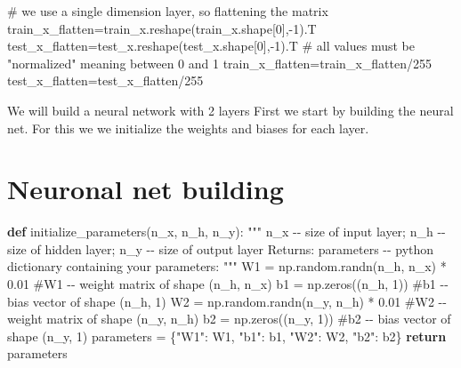 \documentclass[
  letterpaper,
  DIV=11,
  numbers=noendperiod]{scrartcl}
\newenvironment{Shaded}{\begin{snugshade}}{\end{snugshade}}
\newcommand{\CommentTok}[1]{\textcolor[rgb]{0.37,0.37,0.37}{#1}}
\newcommand{\ControlFlowTok}[1]{\textcolor[rgb]{0.00,0.23,0.31}{\textbf{#1}}}
\newcommand{\DecValTok}[1]{\textcolor[rgb]{0.68,0.00,0.00}{#1}}
\newcommand{\FloatTok}[1]{\textcolor[rgb]{0.68,0.00,0.00}{#1}}
\newcommand{\KeywordTok}[1]{\textcolor[rgb]{0.00,0.23,0.31}{\textbf{#1}}}
\newcommand{\NormalTok}[1]{\textcolor[rgb]{0.00,0.23,0.31}{#1}}
\newcommand{\OperatorTok}[1]{\textcolor[rgb]{0.37,0.37,0.37}{#1}}
\newcommand{\StringTok}[1]{\textcolor[rgb]{0.13,0.47,0.30}{#1}}
\begin{document}
\begin{Shaded}
\begin{Highlighting}[]
\CommentTok{\# we use a single dimension layer, so flattening the matrix}
\NormalTok{train\_x\_flatten}\OperatorTok{=}\NormalTok{train\_x.reshape(train\_x.shape[}\DecValTok{0}\NormalTok{],}\OperatorTok{{-}}\DecValTok{1}\NormalTok{).T}
\NormalTok{test\_x\_flatten}\OperatorTok{=}\NormalTok{test\_x.reshape(test\_x.shape[}\DecValTok{0}\NormalTok{],}\OperatorTok{{-}}\DecValTok{1}\NormalTok{).T}
\CommentTok{\# all values must be "normalized" meaning between 0 and 1}
\NormalTok{train\_x\_flatten}\OperatorTok{=}\NormalTok{train\_x\_flatten}\OperatorTok{/}\DecValTok{255}
\NormalTok{test\_x\_flatten}\OperatorTok{=}\NormalTok{test\_x\_flatten}\OperatorTok{/}\DecValTok{255}
\end{Highlighting}
\end{Shaded}

We will build a neural network with 2 layers First we start by building
the neural net. For this we we initialize the weights and biases for
each layer.

\section{Neuronal net building}\label{neuronal-net-building}

\begin{Shaded}
\begin{Highlighting}[]
\KeywordTok{def}\NormalTok{ initialize\_parameters(n\_x, n\_h, n\_y):}
    \CommentTok{"""}
\CommentTok{    n\_x {-}{-} size of input layer; }
\CommentTok{    n\_h {-}{-} size of hidden layer; }
\CommentTok{    n\_y {-}{-} size of output layer}
\CommentTok{    Returns:}
\CommentTok{    parameters {-}{-} python dictionary containing your parameters:             }
\CommentTok{    """}
\NormalTok{    W1 }\OperatorTok{=}\NormalTok{ np.random.randn(n\_h, n\_x) }\OperatorTok{*} \FloatTok{0.01} \CommentTok{\#W1 {-}{-} weight matrix of shape (n\_h, n\_x)}
\NormalTok{    b1 }\OperatorTok{=}\NormalTok{ np.zeros((n\_h, }\DecValTok{1}\NormalTok{))               }\CommentTok{\#b1 {-}{-} bias vector of shape (n\_h, 1)}
\NormalTok{    W2 }\OperatorTok{=}\NormalTok{ np.random.randn(n\_y, n\_h) }\OperatorTok{*} \FloatTok{0.01} \CommentTok{\#W2 {-}{-} weight matrix of shape (n\_y, n\_h)}
\NormalTok{    b2 }\OperatorTok{=}\NormalTok{ np.zeros((n\_y, }\DecValTok{1}\NormalTok{))               }\CommentTok{\#b2 {-}{-} bias vector of shape (n\_y, 1)    }
\NormalTok{    parameters }\OperatorTok{=}\NormalTok{ \{}\StringTok{"W1"}\NormalTok{: W1,}
                  \StringTok{"b1"}\NormalTok{: b1,}
                  \StringTok{"W2"}\NormalTok{: W2,}
                  \StringTok{"b2"}\NormalTok{: b2\}}
    \ControlFlowTok{return}\NormalTok{ parameters}
\end{Highlighting}
\end{Shaded}
\end{document}

